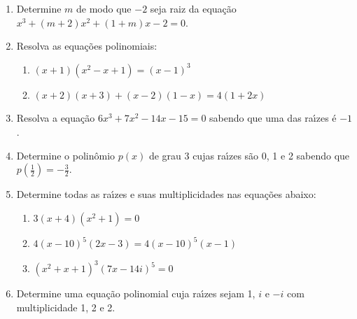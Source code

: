 \documentclass[a4paper,5pt]{amsbook}
\begin{document}
\vspace{1cm}
\begin{enumerate}
	\vspace{0.5cm}
    \item Determine $m$ de modo que $-2$ seja raiz da equa\c{c}\~ao
        $x^3+(m+2)x^2+(1+m)x-2=0$.

    \vspace{0.5cm}
    \item Resolva as equa\c{c}\~oes polinomiais:
        \begin{enumerate}
            \vspace{0.3cm}
            \item $(x+1)(x^2-x+1) = (x-1)^3$
            \vspace{0.3cm}
            \item $(x+2)(x+3)+(x-2)(1-x) = 4(1+2x)$
        \end{enumerate}

    \vspace{0.5cm}
    \item Resolva a equa\c{c}\~ao $6x^3+7x^2-14x-15 = 0$ sabendo que uma das ra\'{\i}zes
        \'e $-1$.

    \vspace{0.5cm}
    \item Determine o polin\^omio $p(x)$ de grau 3  cujas ra\'{\i}zes s\~ao 0, 1 e 2
        sabendo que $p\left(\frac{1}{2}\right) = -\frac{3}{2}$.

    \vspace{0.5cm}
    \item Determine todas as ra\'{\i}zes e suas multiplicidades nas equa\c{c}\~oes abaixo:
        \begin{enumerate}
            \vspace{0.3cm}
            \item $3(x+4)(x^2+1) = 0$
            \vspace{0.3cm}
            \item $4{(x-10)}^5(2x-3) = 4{(x-10)}^5(x-1)$
            \vspace{0.3cm}
            \item ${(x^2+x+1)}^3{(7x-14i)}^5=0$
        \end{enumerate}

    \vspace{0.5cm}
    \item Determine uma equa\c{c}\~ao polinomial cuja ra\'{\i}zes sejam 1, $i$ e $-i$
        com multiplicidade 1, 2 e 2.


\end{enumerate}
\end{document}

